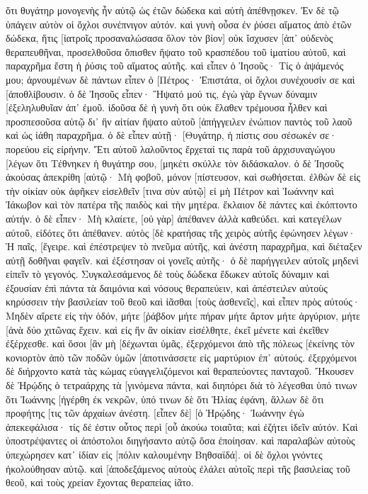 ὅτι θυγάτηρ μονογενὴς ἦν αὐτῷ ὡς ἐτῶν δώδεκα καὶ αὐτὴ ἀπέθνῃσκεν. Ἐν δὲ τῷ ὑπάγειν αὐτὸν οἱ ὄχλοι συνέπνιγον αὐτόν. 
καὶ γυνὴ οὖσα ἐν ῥύσει αἵματος ἀπὸ ἐτῶν δώδεκα, ἥτις [ἰατροῖς προσαναλώσασα ὅλον τὸν βίον] οὐκ ἴσχυσεν [ἀπ᾽ οὐδενὸς θεραπευθῆναι, 
προσελθοῦσα ὄπισθεν ἥψατο τοῦ κρασπέδου τοῦ ἱματίου αὐτοῦ, καὶ παραχρῆμα ἔστη ἡ ῥύσις τοῦ αἵματος αὐτῆς. 
καὶ εἶπεν ὁ Ἰησοῦς· Τίς ὁ ἁψάμενός μου; ἀρνουμένων δὲ πάντων εἶπεν ὁ [Πέτρος· Ἐπιστάτα, οἱ ὄχλοι συνέχουσίν σε καὶ [ἀποθλίβουσιν. 
ὁ δὲ Ἰησοῦς εἶπεν· Ἥψατό μού τις, ἐγὼ γὰρ ἔγνων δύναμιν [ἐξεληλυθυῖαν ἀπ᾽ ἐμοῦ. 
ἰδοῦσα δὲ ἡ γυνὴ ὅτι οὐκ ἔλαθεν τρέμουσα ἦλθεν καὶ προσπεσοῦσα αὐτῷ δι᾽ ἣν αἰτίαν ἥψατο αὐτοῦ [ἀπήγγειλεν ἐνώπιον παντὸς τοῦ λαοῦ καὶ ὡς ἰάθη παραχρῆμα. 
ὁ δὲ εἶπεν αὐτῇ· [Θυγάτηρ, ἡ πίστις σου σέσωκέν σε· πορεύου εἰς εἰρήνην. 
Ἔτι αὐτοῦ λαλοῦντος ἔρχεταί τις παρὰ τοῦ ἀρχισυναγώγου [λέγων ὅτι Τέθνηκεν ἡ θυγάτηρ σου, [μηκέτι σκύλλε τὸν διδάσκαλον. 
ὁ δὲ Ἰησοῦς ἀκούσας ἀπεκρίθη [αὐτῷ· Μὴ φοβοῦ, μόνον [πίστευσον, καὶ σωθήσεται. 
ἐλθὼν δὲ εἰς τὴν οἰκίαν οὐκ ἀφῆκεν εἰσελθεῖν [τινα σὺν αὐτῷ] εἰ μὴ Πέτρον καὶ Ἰωάννην καὶ Ἰάκωβον καὶ τὸν πατέρα τῆς παιδὸς καὶ τὴν μητέρα. 
ἔκλαιον δὲ πάντες καὶ ἐκόπτοντο αὐτήν. ὁ δὲ εἶπεν· Μὴ κλαίετε, [οὐ γὰρ] ἀπέθανεν ἀλλὰ καθεύδει. 
καὶ κατεγέλων αὐτοῦ, εἰδότες ὅτι ἀπέθανεν. 
αὐτὸς [δὲ κρατήσας τῆς χειρὸς αὐτῆς ἐφώνησεν λέγων· Ἡ παῖς, [ἔγειρε. 
καὶ ἐπέστρεψεν τὸ πνεῦμα αὐτῆς, καὶ ἀνέστη παραχρῆμα, καὶ διέταξεν αὐτῇ δοθῆναι φαγεῖν. 
καὶ ἐξέστησαν οἱ γονεῖς αὐτῆς· ὁ δὲ παρήγγειλεν αὐτοῖς μηδενὶ εἰπεῖν τὸ γεγονός. 
Συγκαλεσάμενος δὲ τοὺς δώδεκα ἔδωκεν αὐτοῖς δύναμιν καὶ ἐξουσίαν ἐπὶ πάντα τὰ δαιμόνια καὶ νόσους θεραπεύειν, 
καὶ ἀπέστειλεν αὐτοὺς κηρύσσειν τὴν βασιλείαν τοῦ θεοῦ καὶ ἰᾶσθαι [τοὺς ἀσθενεῖς], 
καὶ εἶπεν πρὸς αὐτούς· Μηδὲν αἴρετε εἰς τὴν ὁδόν, μήτε [ῥάβδον μήτε πήραν μήτε ἄρτον μήτε ἀργύριον, μήτε [ἀνὰ δύο χιτῶνας ἔχειν. 
καὶ εἰς ἣν ἂν οἰκίαν εἰσέλθητε, ἐκεῖ μένετε καὶ ἐκεῖθεν ἐξέρχεσθε. 
καὶ ὅσοι [ἂν μὴ [δέχωνται ὑμᾶς, ἐξερχόμενοι ἀπὸ τῆς πόλεως [ἐκείνης τὸν κονιορτὸν ἀπὸ τῶν ποδῶν ὑμῶν [ἀποτινάσσετε εἰς μαρτύριον ἐπ᾽ αὐτούς. 
ἐξερχόμενοι δὲ διήρχοντο κατὰ τὰς κώμας εὐαγγελιζόμενοι καὶ θεραπεύοντες πανταχοῦ. 
Ἤκουσεν δὲ Ἡρῴδης ὁ τετραάρχης τὰ [γινόμενα πάντα, καὶ διηπόρει διὰ τὸ λέγεσθαι ὑπό τινων ὅτι Ἰωάννης [ἠγέρθη ἐκ νεκρῶν, 
ὑπό τινων δὲ ὅτι Ἠλίας ἐφάνη, ἄλλων δὲ ὅτι προφήτης [τις τῶν ἀρχαίων ἀνέστη. 
[εἶπεν δὲ] [ὁ Ἡρῴδης· Ἰωάννην ἐγὼ ἀπεκεφάλισα· τίς δέ ἐστιν οὗτος περὶ [οὗ ἀκούω τοιαῦτα; καὶ ἐζήτει ἰδεῖν αὐτόν. 
Καὶ ὑποστρέψαντες οἱ ἀπόστολοι διηγήσαντο αὐτῷ ὅσα ἐποίησαν. καὶ παραλαβὼν αὐτοὺς ὑπεχώρησεν κατ᾽ ἰδίαν εἰς [πόλιν καλουμένην Βηθσαϊδά]. 
οἱ δὲ ὄχλοι γνόντες ἠκολούθησαν αὐτῷ. καὶ [ἀποδεξάμενος αὐτοὺς ἐλάλει αὐτοῖς περὶ τῆς βασιλείας τοῦ θεοῦ, καὶ τοὺς χρείαν ἔχοντας θεραπείας ἰᾶτο. 
